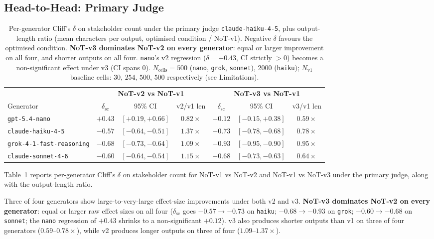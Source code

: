 \documentclass[11pt]{article}
\begin{document}
\subsection{Head-to-Head: Primary Judge}
\label{sec:head_to_head_prim}

\begin{table}[t]
\centering\small
\begin{tabular}{lcccccc}
\toprule
& \multicolumn{3}{c}{\textbf{NoT-v2 vs NoT-v1}} & \multicolumn{3}{c}{\textbf{NoT-v3 vs NoT-v1}} \\
\cmidrule(lr){2-4}\cmidrule(lr){5-7}
Generator & $\delta_{\text{sc}}$ & 95\% CI & v2/v1 len & $\delta_{\text{sc}}$ & 95\% CI & v3/v1 len \\
\midrule
\texttt{gpt-5.4-nano}            & $+0.43$ & $[+0.19, +0.66]$ & $0.82\times$ & $+0.12$ & $[-0.15, +0.38]$ & $0.59\times$ \\
\texttt{claude-haiku-4-5}        & $-0.57$ & $[-0.64, -0.51]$ & $1.37\times$ & $-0.73$ & $[-0.78, -0.68]$ & $0.78\times$ \\
\texttt{grok-4-1-fast-reasoning} & $-0.68$ & $[-0.73, -0.64]$ & $1.09\times$ & $-0.93$ & $[-0.95, -0.90]$ & $0.95\times$ \\
\texttt{claude-sonnet-4-6}       & $-0.60$ & $[-0.64, -0.54]$ & $1.15\times$ & $-0.68$ & $[-0.73, -0.63]$ & $0.64\times$ \\
\bottomrule
\end{tabular}
\caption{Per-generator Cliff's $\delta$ on stakeholder count under the primary judge \texttt{claude-haiku-4-5}, plus output-length ratio (mean characters per output, optimised condition / NoT-v1).
Negative $\delta$ favours the optimised condition.
\textbf{NoT-v3 dominates NoT-v2 on every generator}: equal or larger improvement on all four, and shorter outputs on all four.
\texttt{nano}'s v2 regression ($\delta = +0.43$, CI strictly $> 0$) becomes a non-significant effect under v3 (CI spans $0$).
$N_{\text{cells}} = 500$ (\texttt{nano}, \texttt{grok}, \texttt{sonnet}), $2000$ (\texttt{haiku}); $N_{\text{v1}}$ baseline cells: $30$, $254$, $500$, $500$ respectively (see Limitations).}
\label{tab:head_to_head}
\end{table}

Table~\ref{tab:head_to_head} reports per-generator Cliff's $\delta$ on stakeholder count for NoT-v1 vs NoT-v2 and NoT-v1 vs NoT-v3 under the primary judge, along with the output-length ratio.

Three of four generators show large-to-very-large effect-size improvements under both v2 and v3.
\textbf{NoT-v3 dominates NoT-v2 on every generator}: equal or larger raw effect sizes on all four ($\delta_{\text{sc}}$ goes $-0.57 \to -0.73$ on \texttt{haiku}; $-0.68 \to -0.93$ on \texttt{grok}; $-0.60 \to -0.68$ on \texttt{sonnet}; the \texttt{nano} regression of $+0.43$ shrinks to a non-significant $+0.12$).
v3 also produces shorter outputs than v1 on three of four generators ($0.59$--$0.78\times$), while v2 produces longer outputs on three of four ($1.09$--$1.37\times$).
\end{document}
